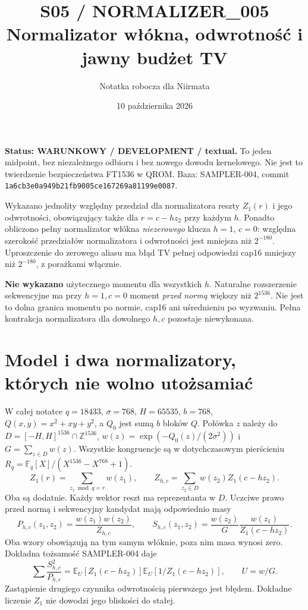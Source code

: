 \documentclass[11pt,a4paper]{article}
\title{S05 / NORMALIZER\_005\\\large Normalizator włókna, odwrotność i jawny budżet TV}
\author{Notatka robocza dla Niirmata}
\date{10 października 2026}
\newcommand{\code}[1]{\nolinkurl{#1}}
\newcommand{\E}{\mathbb E}
\begin{document}
\maketitle

\textbf{Status: WARUNKOWY / DEVELOPMENT / textual.}
To jeden midpoint, bez niezależnego odbioru i bez nowego dowodu kernelowego.
Nie jest to twierdzenie bezpieczeństwa FT1536 w QROM.
Baza: SAMPLER-004, commit \code{1a6cb3e0a949b21fb9005ce167269a81199e0087}.

Wykazano jednolity względny przedział dla normalizatora reszty
$Z_1(r)$ i jego odwrotności, obowiązujący także dla $r=c-hz_2$ przy każdym $h$.
Ponadto obliczono pełny normalizator włókna \emph{niezerowego} klucza
$h=1$, $c=0$: względna szerokość przedziałów normalizatora i odwrotności
jest mniejsza niż $2^{-180}$. Uproszczenie do zerowego aliasu ma błąd TV
pełnej odpowiedzi cap16 mniejszy niż $2^{-180}$, z porażkami włącznie.

\textbf{Nie wykazano} użytecznego momentu dla wszystkich $h$.
Naturalne rozszerzenie sekwencyjne ma przy $h=1,c=0$ moment
\emph{przed normą} większy niż $2^{1536}$. Nie jest to dolna granica
momentu po normie, cap16 ani uśrednieniu po wyzwaniu.
Pełna kontrakcja normalizatora dla dowolnego $h,c$ pozostaje niewykonana.

\section{Model i dwa normalizatory, których nie wolno utożsamiać}
W całej notatce $q=18433$, $\sigma=768$, $H=65535$, $b=768$,
$Q(x,y)=x^2+xy+y^2$, a $Q_0$ jest sumą $b$ bloków $Q$.
Połówka $z$ należy do $D=[-H,H]^{1536}\cap\mathbb Z^{1536}$,
$w(z)=\exp(-Q_0(z)/(2\sigma^2))$ i $G=\sum_{z\in D}w(z)$.
Wszystkie kongruencje są w dotychczasowym pierścieniu
$R_q=\mathbb F_q[X]/(X^{1536}-X^{768}+1)$.
\[
 Z_1(r)=\sum_{z_1\bmod q=r}w(z_1),\qquad
 Z_{h,c}=\sum_{z_2\in D}w(z_2)Z_1(c-hz_2).
\]
Oba są dodatnie. Każdy wektor reszt ma reprezentanta w $D$.
Uczciwe prawo przed normą i sekwencyjny kandydat mają odpowiednio masy
\[
 P_{h,c}(z_1,z_2)=\frac{w(z_1)w(z_2)}{Z_{h,c}},\qquad
 S_{h,c}(z_1,z_2)=\frac{w(z_2)}G\frac{w(z_1)}{Z_1(c-hz_2)}.
\]
Oba wzory obowiązują na tym samym włóknie, poza nim masa wynosi zero.
Dokładna tożsamość SAMPLER-004 daje
\[
 \sum\frac{S_{h,c}^2}{P_{h,c}}
 =\E_{U}[Z_1(c-hz_2)]\E_U[1/Z_1(c-hz_2)],\qquad U=w/G.
\]
Zastąpienie drugiego czynnika odwrotnością pierwszego jest błędem.
Dokładne liczenie $Z_1$ nie dowodzi jego bliskości do stałej.
\end{document}
